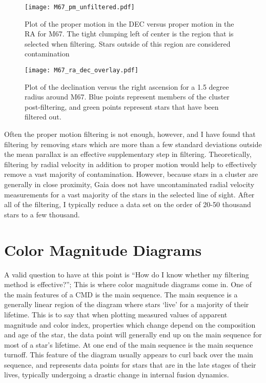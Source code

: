 \documentclass[aps,prb,twocolumn,groupedaddress,nofootinbib,floatfix]{revtex4-1}
\begin{document}
\begin{figure}[!h]
	\centering
      \texttt{[image: M67\_pm\_unfiltered.pdf]}
	\caption{Plot of the proper motion in the DEC versus proper motion in the RA for M67. The tight clumping left of center is the region that is selected when filtering. Stars outside of this region are considered contamination}
	\label{fig:M67_pos}
\end{figure}


\begin{figure}[!h]
	\centering
      \texttt{[image: M67\_ra\_dec\_overlay.pdf]}
	\caption{Plot of the declination versus the right ascension for a 1.5 degree radius around M67. Blue points represent members of the cluster post-filtering, and green points represent stars that have been filtered out.}
	\label{fig:M67_pos}
\end{figure}

Often the proper motion filtering is not enough, however, and I have found that filtering by removing stars which are more than a few standard deviations outside the mean parallax is an effective supplementary step in filtering. Theoretically, filtering by radial velocity in addition to proper motion would help to effectively remove a vast majority of contamination. However, because stars in a cluster are generally in close proximity, Gaia does not have uncontaminated radial velocity measurements for a vast majority of the stars in the selected line of sight. After all of the filtering, I typically reduce a data set on the order of 20-50 thousand stars to a few thousand.

\section*{Color Magnitude Diagrams}
A valid question to have at this point is ``How do I know whether my filtering method is effective?''; This is where color magnitude diagrams come in. One of the main features of a CMD is the main sequence. The main sequence is a generally linear region of the diagram where stars `live' for a majority of their lifetime. This is to say that when plotting measured values of apparent magnitude and color index, properties which change depend on the composition and age of the star, the data point will generally end up on the main sequence for most of a star's lifetime. At one end of the main sequence is the main sequence turnoff. This feature of the diagram usually appears to curl back over the main sequence, and represents data points for stars that are in the late stages of their lives, typically undergoing a drastic change in internal fusion dynamics. 
\end{document}

